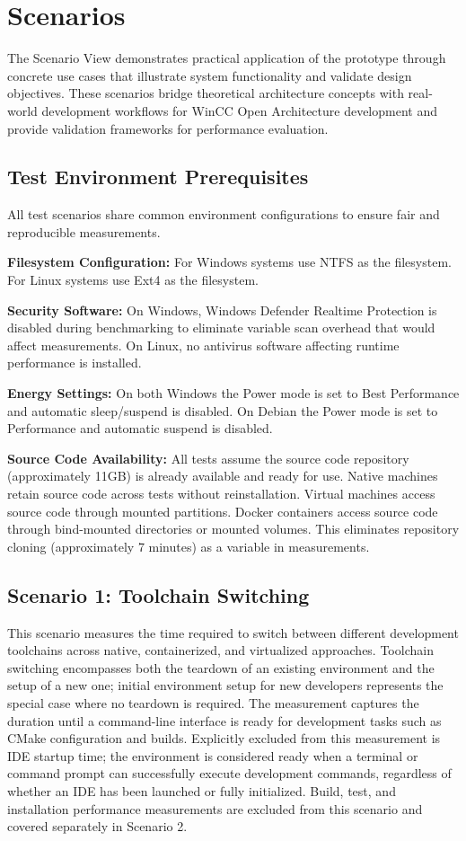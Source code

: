 \section{Scenarios}

The Scenario View demonstrates practical application of the prototype through concrete use cases that illustrate system functionality and validate design objectives.
These scenarios bridge theoretical architecture concepts with real-world development workflows for WinCC Open Architecture development and provide validation frameworks for performance evaluation.

\subsection{Test Environment Prerequisites}

All test scenarios share common environment configurations to ensure fair and reproducible measurements.

\textbf{Filesystem Configuration:}
For Windows systems use NTFS as the filesystem.
For Linux systems use Ext4 as the filesystem.

\textbf{Security Software:}
On Windows, Windows Defender Realtime Protection is disabled during benchmarking to eliminate variable scan overhead that would affect measurements.
On Linux, no antivirus software affecting runtime performance is installed.

\textbf{Energy Settings:}
On both Windows the Power mode is set to Best Performance and automatic sleep/suspend is disabled.
On Debian the Power mode is set to Performance and automatic suspend is disabled.

\textbf{Source Code Availability:}
All tests assume the source code repository (approximately 11GB) is already available and ready for use.
Native machines retain source code across tests without reinstallation.
Virtual machines access source code through mounted partitions.
Docker containers access source code through bind-mounted directories or mounted volumes.
This eliminates repository cloning (approximately 7 minutes) as a variable in measurements.

\subsection{Scenario 1: Toolchain Switching}

This scenario measures the time required to switch between different development toolchains across native, containerized, and virtualized approaches.
Toolchain switching encompasses both the teardown of an existing environment and the setup of a new one; initial environment setup for new developers represents the special case where no teardown is required.
The measurement captures the duration until a command-line interface is ready for development tasks such as CMake configuration and builds.
Explicitly excluded from this measurement is IDE startup time; the environment is considered ready when a terminal or command prompt can successfully execute development commands, regardless of whether an IDE has been launched or fully initialized.
Build, test, and installation performance measurements are excluded from this scenario and covered separately in Scenario 2.

